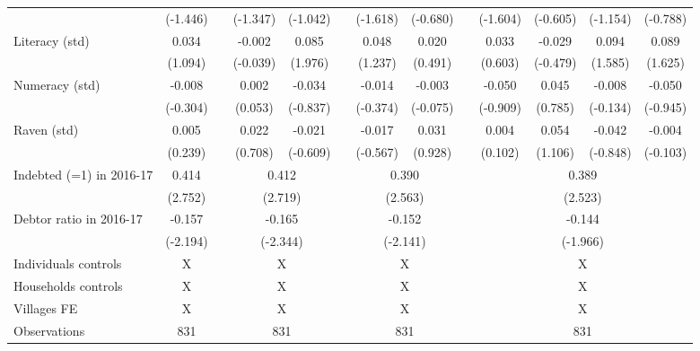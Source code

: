 \begin{table}[htbp]
{\begin{tabular}{lcccccccccccc}
          & (-1.446) &       & (-1.347) & (-1.042) &       & (-1.618) & (-0.680) &       & (-1.604) & (-0.605) & (-1.154) & (-0.788) \\
    Literacy (std) & 0.034 &       & -0.002 & \cellcolor[rgb]{ 1,  1,  0}0.085 &       & 0.048 & 0.020 &       & 0.033 & -0.029 & 0.094 & 0.089 \\
          & (1.094) &       & (-0.039) & (1.976) &       & (1.237) & (0.491) &       & (0.603) & (-0.479) & (1.585) & (1.625) \\
    Numeracy (std) & -0.008 &       & 0.002 & -0.034 &       & -0.014 & -0.003 &       & -0.050 & 0.045 & -0.008 & -0.050 \\
          & (-0.304) &       & (0.053) & (-0.837) &       & (-0.374) & (-0.075) &       & (-0.909) & (0.785) & (-0.134) & (-0.945) \\
    Raven (std) & 0.005 &       & 0.022 & -0.021 &       & -0.017 & 0.031 &       & 0.004 & 0.054 & -0.042 & -0.004 \\
          & (0.239) &       & (0.708) & (-0.609) &       & (-0.567) & (0.928) &       & (0.102) & (1.106) & (-0.848) & (-0.103) \\
\cmidrule{1-2}\cmidrule{4-5}\cmidrule{7-8}\cmidrule{10-13}    Indebted (=1) in 2016-17 & 0.414 &       & \multicolumn{2}{c}{0.412} &       & \multicolumn{2}{c}{0.390} &       & \multicolumn{4}{c}{0.389} \\
          & (2.752) &       & \multicolumn{2}{c}{(2.719)} &       & \multicolumn{2}{c}{(2.563)} &       & \multicolumn{4}{c}{(2.523)} \\
    Debtor ratio in 2016-17 & -0.157 &       & \multicolumn{2}{c}{-0.165} &       & \multicolumn{2}{c}{-0.152} &       & \multicolumn{4}{c}{-0.144} \\
          & (-2.194) &       & \multicolumn{2}{c}{(-2.344)} &       & \multicolumn{2}{c}{(-2.141)} &       & \multicolumn{4}{c}{(-1.966)} \\
    Individuals controls & X     &       & \multicolumn{2}{c}{X} &       & \multicolumn{2}{c}{X} &       & \multicolumn{4}{c}{X} \\
    Households controls & X     &       & \multicolumn{2}{c}{X} &       & \multicolumn{2}{c}{X} &       & \multicolumn{4}{c}{X} \\
    Villages FE & X     &       & \multicolumn{2}{c}{X} &       & \multicolumn{2}{c}{X} &       & \multicolumn{4}{c}{X} \\
    \midrule
    Observations & 831   &       & \multicolumn{2}{c}{831} &       & \multicolumn{2}{c}{831} &       & \multicolumn{4}{c}{831} \\

\end{tabular}}
\end{table}
